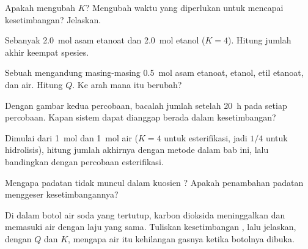 \begin{exercise}[$\star$]\label{exo:g12:equilibrium:5}
Apakah  mengubah $K$? Mengubah waktu yang diperlukan untuk
mencapai kesetimbangan? Jelaskan.
\end{exercise}

\begin{exercise}[$\star\star$]\label{exo:g12:equilibrium:6}
Sebanyak \qty{2.0}{mol} asam etanoat dan \qty{2.0}{mol} etanol
 ($K = 4$). Hitung jumlah akhir keempat spesies.
\end{exercise}

\begin{exercise}[$\star\star$]\label{exo:g12:equilibrium:7}
Sebuah  mengandung masing-masing \qty{0.5}{mol} asam etanoat,
etanol, etil etanoat, dan air. Hitung $Q$. Ke arah mana  itu
berubah?
\end{exercise}

\begin{exercise}[$\star\star$]\label{exo:g12:equilibrium:8}
Dengan gambar kedua percobaan, bacalah jumlah  setelah
\qty{20}{h} pada setiap percobaan. Kapan sistem dapat dianggap berada
dalam kesetimbangan?
\end{exercise}

\begin{exercise}[$\star\star$]\label{exo:g12:equilibrium:9}
Dimulai dari \qty{1}{mol}  dan \qty{1}{mol} air ($K = 4$ untuk
esterifikasi, jadi $1/4$ untuk hidrolisis), hitung jumlah akhirnya
dengan metode dalam bab ini, lalu bandingkan dengan percobaan
esterifikasi.
\end{exercise}

\begin{exercise}[$\star\star$]\label{exo:g12:equilibrium:10}
Mengapa padatan tidak muncul dalam kuosien
? Apakah penambahan padatan menggeser
kesetimbangannya?
\end{exercise}

\begin{exercise}[$\star\star$]\label{exo:g12:equilibrium:11}
Di dalam botol air soda yang tertutup, karbon dioksida meninggalkan dan
memasuki air dengan laju yang sama. Tuliskan kesetimbangan
, lalu jelaskan, dengan $Q$ dan $K$, mengapa air
itu kehilangan gasnya ketika botolnya dibuka.
\end{exercise}

